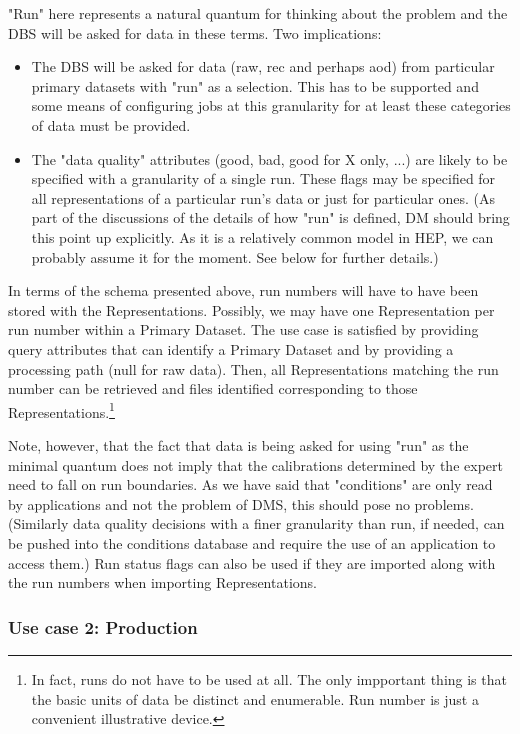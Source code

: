 \documentclass{cmspaper}
\begin{document}
"Run" here represents a natural quantum for thinking about the problem and
the DBS will be asked for data in these terms. Two implications:
\begin{itemize}
\item The DBS will be asked for data (raw, rec and perhaps aod) from particular
    primary datasets with "run" as a selection. This has to be supported and
    some means of configuring jobs at this granularity for at least these
    categories of data must be provided.

\item The "data quality" attributes (good, bad, good for X only, ...) are likely 
    to be specified with a granularity of a single run. These flags may be
    specified for all representations of a particular run's data or just
    for particular ones. (As part of the discussions of the details of how
    "run" is defined, DM should bring this point up explicitly. As it is a 
    relatively common model in HEP, we can probably assume it for the moment.
    See below for further details.)
\end{itemize}

In terms of the schema presented above, run numbers will have to have been 
stored with the Representations.  Possibly, we may have one Representation
per run number within a Primary Dataset.  The use case is satisfied by 
providing query attributes that can identify a Primary Dataset and by 
providing a processing path (null for raw data).  Then, all 
Representations matching the run number can be retrieved and files 
identified corresponding to those Representations.\footnote{In fact, runs 
do not have to be used at all.  The only impportant thing is that the 
basic units of data be distinct and enumerable.  Run number is just a convenient 
illustrative device.}

Note, however, that the fact that data is being asked for using "run" as
the minimal quantum does not imply that the calibrations determined by
the expert need to fall on run boundaries. As we have said that "conditions"
are only read by applications and not the problem of DMS, this should pose no
problems. (Similarly data quality decisions with a finer granularity than 
run, if needed, can be pushed into the conditions database and require 
the use of an application to access them.)  Run status flags can also be used 
if they are imported along with the run numbers when importing Representations.

\subsubsection{Use case 2: Production}
\label{sec:UCprod}
\end{document}
